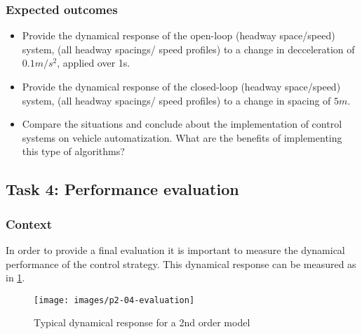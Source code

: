 \documentclass[]{book}
\providecommand{\tightlist}{%
  \setlength{\itemsep}{0pt}\setlength{\parskip}{0pt}}
\theoremstyle{definition}
\theoremstyle{definition}
\theoremstyle{definition}
\theoremstyle{remark}
\begin{document}
\hypertarget{expected-outcomes-6}{%
\subsubsection*{Expected outcomes}\label{expected-outcomes-6}}

\begin{itemize}
\tightlist
\item
  Provide the dynamical response of the open-loop (headway space/speed)
  system, (all headway spacings/ speed profiles) to a change in
  decceleration of \(0.1m/s^2\), applied over 1s.\\
\item
  Provide the dynamical response of the closed-loop (headway
  space/speed) system, (all headway spacings/ speed profiles) to a
  change in spacing of \(5m\).
\item
  Compare the situations and conclude about the implementation of
  control systems on vehicle automatization. What are the benefits of
  implementing this type of algorithms?
\end{itemize}

\hypertarget{task-4-performance-evaluation-1}{%
\subsection*{Task 4: Performance
evaluation}\label{task-4-performance-evaluation-1}}

\hypertarget{context-8}{%
\subsubsection*{Context}\label{context-8}}

In order to provide a final evaluation it is important to measure the
dynamical performance of the control strategy. This dynamical response
can be measured as in \ref{fig:dynamic2}.



\begin{figure}

{\centering \texttt{[image: images/p2-04-evaluation]} 

}

\caption{Typical dynamical response for a 2nd order model}\label{fig:dynamic2}
\end{figure}
\end{document}
